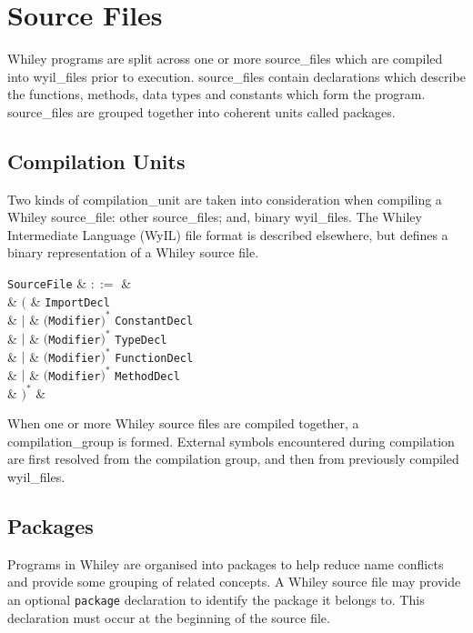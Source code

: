 \chapter{Source Files}
\label{c_source_files}
Whiley programs are split across one or more \gls{source_file}s which are compiled into \gls{wyil_file}s prior to execution. \Gls{source_file}s contain declarations which describe the functions, methods, data types and constants which form the program. \Gls{source_file}s are grouped together into coherent units called \gls{package}s.


\section{Compilation Units}
\label{c_source_files_compilation_units}
Two kinds of \gls{compilation_unit} are taken into consideration when compiling a Whiley \gls{source_file}: other \gls{source_file}s; and, binary \gls{wyil_file}s.  The Whiley Intermediate Language (WyIL) file format is described elsewhere, but defines a binary representation of a Whiley source file.  

\begin{syntax}
\verb+SourceFile+ & $::=$ &  \\
&  $\big($ & \verb+ImportDecl+\\
& $|$ & $($\verb+Modifier+$)^*$ \verb+ConstantDecl+\\
& $|$ & $($\verb+Modifier+$)^*$ \verb+TypeDecl+\\
& $|$ & $($\verb+Modifier+$)^*$ \verb+FunctionDecl+\\
& $|$ & $($\verb+Modifier+$)^*$ \verb+MethodDecl+ \\
& $\big)^*$ &\\
\end{syntax}

When one or more Whiley source files are compiled together, a \gls{compilation_group} is formed.  External symbols encountered during compilation are first resolved from the compilation group, and then from previously compiled \gls{wyil_file}s.

\section{Packages}
\label{c_source_files_packages}

Programs in Whiley are organised into \gls{package}s to help reduce name conflicts and provide some grouping of related concepts.  A Whiley source file may provide an optional \lstinline{package} declaration to identify the package it belongs to.  This declaration must occur at the beginning of the source file.


